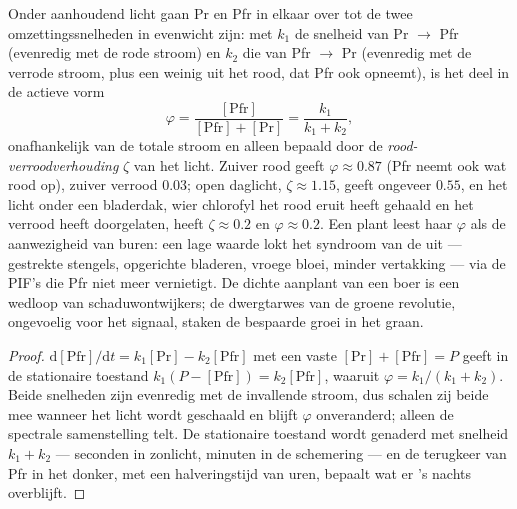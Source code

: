 \begin{proposition}\label{prop:b3:plant-molecular-physiology:photoequilibrium}
Onder aanhoudend licht gaan Pr en Pfr in elkaar over tot de twee
omzettingssnelheden in evenwicht zijn: met $k_{1}$ de snelheid van Pr $\to$ Pfr
(evenredig met de rode stroom) en $k_{2}$ die van Pfr $\to$ Pr
(evenredig met de verrode stroom, plus een weinig uit het rood, dat Pfr
ook opneemt), is het deel in de actieve vorm
\[
\varphi = \frac{[\text{Pfr}]}{[\text{Pfr}] + [\text{Pr}]} = \frac{k_{1}}{k_{1} + k_{2}},
\]
onafhankelijk van de totale stroom en alleen bepaald door de
\emph{rood-verroodverhouding} $\zeta$ van het licht. Zuiver rood geeft
$\varphi \approx 0.87$ (Pfr neemt ook wat rood op), zuiver verrood
$0.03$; open daglicht, $\zeta \approx
1.15$, geeft ongeveer $0.55$, en het licht onder een bladerdak, wier
chlorofyl het rood eruit heeft gehaald en het verrood heeft
doorgelaten, heeft $\zeta \approx 0.2$ en $\varphi \approx 0.2$. Een
plant leest haar $\varphi$ als de aanwezigheid van buren: een lage
waarde lokt het syndroom van de \emph{} uit ---
gestrekte stengels, opgerichte bladeren, vroege bloei, minder
vertakking --- via de PIF's die Pfr niet meer vernietigt. De dichte
aanplant van een boer is een wedloop van schaduwontwijkers; de
dwergtarwes van de groene revolutie, ongevoelig voor het signaal,
staken de bespaarde groei in het graan.
\end{proposition}
\begin{proof}
$\mathrm{d}[\text{Pfr}]/\mathrm{d}t = k_{1}[\text{Pr}] - k_{2}[\text{Pfr}]$
met een vaste $[\text{Pr}] + [\text{Pfr}] = P$ geeft in de stationaire
toestand $k_{1}(P - [\text{Pfr}]) = k_{2}[\text{Pfr}]$, waaruit $\varphi = k_{1}/
(k_{1} + k_{2})$. Beide snelheden zijn evenredig met de invallende
stroom, dus schalen zij beide mee wanneer het licht wordt geschaald en
blijft $\varphi$ onveranderd; alleen de spectrale samenstelling telt.
De stationaire toestand wordt genaderd met snelheid $k_{1} + k_{2}$ ---
seconden in zonlicht, minuten in de schemering --- en de terugkeer van
Pfr in het donker, met een halveringstijd van uren, bepaalt wat er
's nachts overblijft.
\end{proof}

